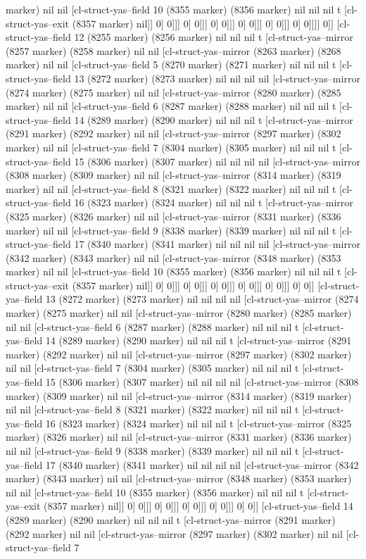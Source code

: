 {{marker) nil nil [cl-struct-yas--field 10 (8355 marker) (8356 marker) nil nil nil t [cl-struct-yas--exit (8357 marker) nil]] 0] 0]]] 0] 0]]] 0] 0]]] 0] 0]]] 0] 0]]] 0] 0]]]] 0]] [cl-struct-yas--field 12 (8255 marker) (8256 marker) nil nil nil t [cl-struct-yas--mirror (8257 marker) (8258 marker) nil nil [cl-struct-yas--mirror (8263 marker) (8268 marker) nil nil [cl-struct-yas--field 5 (8270 marker) (8271 marker) nil nil nil t [cl-struct-yas--field 13 (8272 marker) (8273 marker) nil nil nil nil [cl-struct-yas--mirror (8274 marker) (8275 marker) nil nil [cl-struct-yas--mirror (8280 marker) (8285 marker) nil nil [cl-struct-yas--field 6 (8287 marker) (8288 marker) nil nil nil t [cl-struct-yas--field 14 (8289 marker) (8290 marker) nil nil nil t [cl-struct-yas--mirror (8291 marker) (8292 marker) nil nil [cl-struct-yas--mirror (8297 marker) (8302 marker) nil nil [cl-struct-yas--field 7 (8304 marker) (8305 marker) nil nil nil t [cl-struct-yas--field 15 (8306 marker) (8307 marker) nil nil nil nil [cl-struct-yas--mirror (8308 marker) (8309 marker) nil nil [cl-struct-yas--mirror (8314 marker) (8319 marker) nil nil [cl-struct-yas--field 8 (8321 marker) (8322 marker) nil nil nil t [cl-struct-yas--field 16 (8323 marker) (8324 marker) nil nil nil t [cl-struct-yas--mirror (8325 marker) (8326 marker) nil nil [cl-struct-yas--mirror (8331 marker) (8336 marker) nil nil [cl-struct-yas--field 9 (8338 marker) (8339 marker) nil nil nil t [cl-struct-yas--field 17 (8340 marker) (8341 marker) nil nil nil nil [cl-struct-yas--mirror (8342 marker) (8343 marker) nil nil [cl-struct-yas--mirror (8348 marker) (8353 marker) nil nil [cl-struct-yas--field 10 (8355 marker) (8356 marker) nil nil nil t [cl-struct-yas--exit (8357 marker) nil]] 0] 0]]] 0] 0]]] 0] 0]]] 0] 0]]] 0] 0]]] 0] 0]] [cl-struct-yas--field 13 (8272 marker) (8273 marker) nil nil nil nil [cl-struct-yas--mirror (8274 marker) (8275 marker) nil nil [cl-struct-yas--mirror (8280 marker) (8285 marker) nil nil [cl-struct-yas--field 6 (8287 marker) (8288 marker) nil nil nil t [cl-struct-yas--field 14 (8289 marker) (8290 marker) nil nil nil t [cl-struct-yas--mirror (8291 marker) (8292 marker) nil nil [cl-struct-yas--mirror (8297 marker) (8302 marker) nil nil [cl-struct-yas--field 7 (8304 marker) (8305 marker) nil nil nil t [cl-struct-yas--field 15 (8306 marker) (8307 marker) nil nil nil nil [cl-struct-yas--mirror (8308 marker) (8309 marker) nil nil [cl-struct-yas--mirror (8314 marker) (8319 marker) nil nil [cl-struct-yas--field 8 (8321 marker) (8322 marker) nil nil nil t [cl-struct-yas--field 16 (8323 marker) (8324 marker) nil nil nil t [cl-struct-yas--mirror (8325 marker) (8326 marker) nil nil [cl-struct-yas--mirror (8331 marker) (8336 marker) nil nil [cl-struct-yas--field 9 (8338 marker) (8339 marker) nil nil nil t [cl-struct-yas--field 17 (8340 marker) (8341 marker) nil nil nil nil [cl-struct-yas--mirror (8342 marker) (8343 marker) nil nil [cl-struct-yas--mirror (8348 marker) (8353 marker) nil nil [cl-struct-yas--field 10 (8355 marker) (8356 marker) nil nil nil t [cl-struct-yas--exit (8357 marker) nil]] 0] 0]]] 0] 0]]] 0] 0]]] 0] 0]]] 0] 0]] [cl-struct-yas--field 14 (8289 marker) (8290 marker) nil nil nil t [cl-struct-yas--mirror (8291 marker) (8292 marker) nil nil [cl-struct-yas--mirror (8297 marker) (8302 marker) nil nil [cl-struct-yas--field 7 }}
